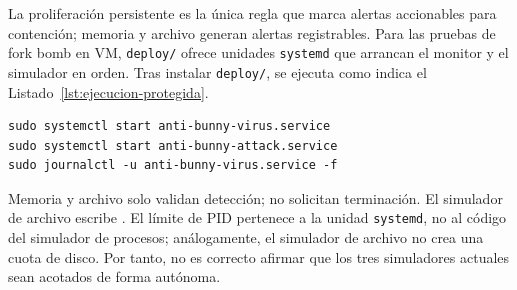 La proliferación persistente es la única regla que marca alertas accionables para
contención; memoria y archivo generan alertas registrables. Para las pruebas de
fork bomb en VM, \texttt{deploy/} ofrece unidades \texttt{systemd} que arrancan
el monitor y el simulador en orden. Tras instalar \texttt{deploy/}, se ejecuta
como indica el Listado~\ref{lst:ejecucion-protegida}.

\begin{lstlisting}[style=comandos,caption={Ejecución del escenario protegido con systemd.},label={lst:ejecucion-protegida}]
sudo systemctl start anti-bunny-virus.service
sudo systemctl start anti-bunny-attack.service
sudo journalctl -u anti-bunny-virus.service -f
\end{lstlisting}

Memoria y archivo solo validan detección; no solicitan terminación. El simulador
de archivo escribe .
El límite de PID pertenece a la unidad \texttt{systemd}, no al código del
simulador de procesos; análogamente, el simulador de archivo no crea una cuota
de disco. Por tanto, no es correcto afirmar que los tres simuladores actuales
sean acotados de forma autónoma.
